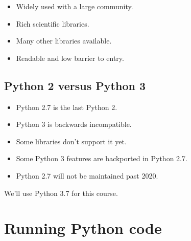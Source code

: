 \documentclass[aspectratio=1610,slidestop]{beamer}
\begin{document}
\begin{pframe}
 \begin{itemize}
  \item Widely used with a large community.
  \item Rich scientific libraries.
  \item Many other libraries available.
  \item Readable and low barrier to entry.
 \end{itemize}
\end{pframe}



\subsection{Python 2 versus Python 3}
\begin{pframe}
 \begin{itemize}
  \item Python 2.7 is the last Python 2.
  \item Python 3 is backwards incompatible.
  \item Some libraries don't support it yet.
  \item Some Python 3 features are backported in Python 2.7.
  \item Python 2.7 will not be maintained past 2020.
 \end{itemize}
  We'll use Python 3.7 for this course.
\end{pframe}


\section{Running Python code}
\end{document}
